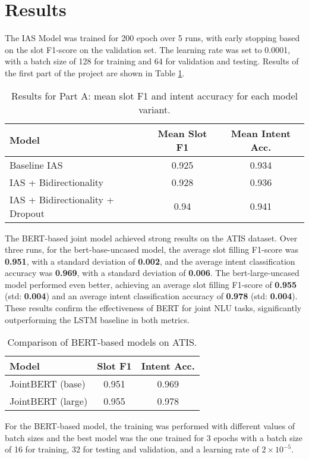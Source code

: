 \documentclass[a4paper]{article}
\begin{document}
\section{Results}
The IAS Model was trained for 200 epoch over 5 runs, with early stopping based on the slot F1-score on the validation set.
The learning rate was set to 0.0001, with a batch size of 128 for training and 64 for validation and testing. 
Results of the first part of the project are shown in Table \ref{tab:partAresults}.
\begin{table}[h!]
  \centering
  \begin{tabular}{lcc}
    \toprule
    \textbf{Model} & \textbf{Mean Slot F1} & \textbf{Mean Intent Acc.} \\
    \midrule
    Baseline IAS & 0.925 & 0.934 \\
    IAS + Bidirectionality & 0.928 & 0.936 \\
    IAS + Bidirectionality + Dropout & 0.94 & 0.941 \\ 
    \bottomrule
  \end{tabular}
  \caption{Results for Part A: mean slot F1 and intent accuracy for each model variant.}
  \label{tab:partAresults}
\end{table}

The BERT-based joint model achieved strong results on the ATIS dataset. Over three runs, for the bert-base-uncased model, the average slot filling F1-score was \textbf{ 0.951}, with a standard deviation of \textbf{0.002}, and the average intent classification accuracy
 was \textbf{0.969}, with a standard deviation of \textbf{0.006}. The bert-large-uncased model performed even better, achieving an average slot filling F1-score of \textbf{0.955} (std: \textbf{0.004}) and an average intent classification accuracy of \textbf{0.978} (std: \textbf{0.004}). 
These results confirm the effectiveness of BERT for joint NLU tasks, significantly outperforming the LSTM baseline in both metrics.

\begin{table}[h!]
  \centering
  \begin{tabular}{lcc}
    \toprule
    \textbf{Model} & \textbf{Slot F1} & \textbf{Intent Acc.} \\
    \midrule
    JointBERT (base) & 0.951 & 0.969 \\
    JointBERT (large)   & 0.955 & 0.978 \\
    \bottomrule
  \end{tabular}
  \caption{Comparison of BERT-based models on ATIS.}
  \label{tab:results}
\end{table}

For the BERT-based model, the training was performed with different values of 
batch sizes and the best model was the one trained for 3 epochs with
 a batch size of 16 for 
training, 32 for testing and validation, and a learning rate 
of $2 \times 10^{-5}$.




\end{document}
